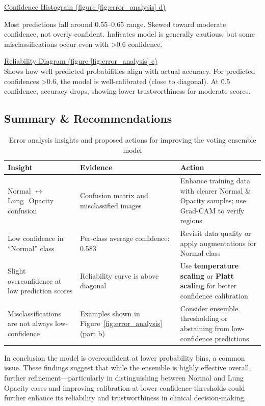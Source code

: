\documentclass{article}
\begin{document}
\vspace{0.4cm}

\underline{Confidence Histogram (figure \ref{fig:error_analysis} d)}

Most predictions fall around 0.55–0.65 range.
Skewed toward moderate confidence, not overly confident.
Indicates model is generally cautious, but some misclassifications occur even with >0.6 confidence.

\vspace{0.4cm}

\underline{Reliability Diagram (figure \ref{fig:error_analysis} c)}\\
Shows how well predicted probabilities align with actual accuracy.
For predicted confidences >0.6, the model is well-calibrated (close to diagonal).
At \~0.5 confidence, accuracy drops, showing lower trustworthiness for moderate scores.


\subsection{Summary \& Recommendations}
\begin{table}[ht]
\centering
\renewcommand{\arraystretch}{1.4}
\begin{tabular}{|p{4.5cm}|p{4.5cm}|p{5.5cm}|}
\hline
\textbf{Insight} & \textbf{Evidence} & \textbf{Action} \\
\hline
Normal $\leftrightarrow$ Lung\_Opacity confusion & Confusion matrix and misclassified images & Enhance training data with clearer Normal \& Opacity samples; use Grad-CAM to verify regions \\
\hline
Low confidence in ``Normal'' class & Per-class average confidence: 0.583 & Revisit data quality or apply augmentations for Normal class \\
\hline
Slight overconfidence at low prediction scores & Reliability curve is above diagonal & Use \textbf{temperature scaling} or \textbf{Platt scaling} for better confidence calibration \\
\hline
Misclassifications are not always low-confidence & Examples shown in Figure~\ref{fig:error_analysis} (part b) & Consider ensemble thresholding or abstaining from low-confidence predictions \\
\hline
\end{tabular}
\caption{Error analysis insights and proposed actions for improving the voting ensemble model}
\label{tab:error_actions}
\end{table}


In conclusion the model is overconfident at lower probability bins, a common issue. These findings suggest that while the ensemble is highly effective overall, further refinement—particularly in distinguishing between Normal and Lung Opacity cases and improving calibration at lower confidence thresholds could further enhance its reliability and trustworthiness in clinical decision-making.\\
\end{document}
